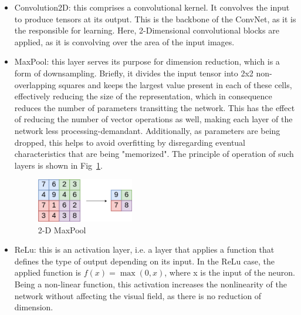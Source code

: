 \begin{itemize}
    \item Convolution2D: this comprises a convolutional kernel. It convolves the input to produce tensors at its output. This is the backbone of the \ac{ConvNet}, as it is the responsible for learning. Here, 2-Dimensional convolutional blocks are applied, as it is convolving over the area of the input images.
    \item MaxPool: this layer serves its purpose for dimension reduction, which is a form of downsampling. Briefly, it divides the input tensor into 2x2 non-overlapping squares and keeps the largest value present in each of these cells, effectively reducing the size of the representation, which in consequence reduces the number of parameters transitting the network. This has the effect of reducing the number of vector operations as well, making each layer of the network less processing-demandant. Additionally, as parameters are being dropped, this helps to avoid overfitting by disregarding eventual characteristics that are being "memorized". The principle of operation of such layers is shown in Fig~\ref{fig:maxpool}.
        \begin{figure}[!htb]
            \centering
              \includegraphics[width=0.4\textwidth]{figures/maxpool}
              \caption{2-D MaxPool}
              \label{fig:maxpool}
        \end{figure}
    \item \ac{ReLu}: this is an activation layer, i.e. a layer that applies a function that defines the type of output depending on its input. In the \ac{ReLu} case, the applied function is \(f(x) =\max(0,x) \), where x is the input of the neuron. Being a non-linear function, this activation increases the nonlinearity of the network without affecting the visual field, as there is no reduction of dimension.
        \begin{figure}[!htb]
            \centering
\end{figure}
\end{itemize}
